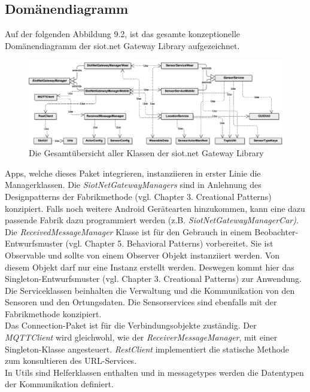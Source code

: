 \subsection{Domänendiagramm}
Auf der folgenden Abbildung 9.2, ist das gesamte konzeptionelle Domänendiagramm der siot.net Gateway Library aufgezeichnet.
\begin{figure}[H]
  \centering
  \includegraphics[scale=0.12]{98_Bilder/09_Konzept/DomaindiagrammSiotNetGatewayLibrary}
  \caption[siot.net Gateway Library Domänendiagramm]{Die Gesamtübersicht aller Klassen der siot.net Gateway Library}
\end{figure}
Apps, welche dieses Paket integrieren, instanziieren in erster Linie die Managerklassen. Die \textit{SiotNetGatewayManagers} sind in Anlehnung des Designpatterns der Fabrikmethode (vgl. \cite{gof:design_patterns} Chapter 3. Creational Patterns) konzipiert. Falls noch weitere Android Gerätearten hinzukommen, kann eine dazu passende Fabrik dazu programmiert werden (z.B. \textit{SiotNetGatewayManagerCar)}. Die \textit{ReceivedMessageManager} Klasse ist für den Gebrauch in einem Beobachter-Entwurfsmuster (vgl. \cite{gof:design_patterns} Chapter 5. Behavioral Patterns) vorbereitet. Sie ist Observable und sollte von einem Observer Objekt instanziiert werden. Von diesem Objekt darf nur eine Instanz erstellt werden. Deswegen kommt hier das Singleton-Entwurfsmuster (vgl. \cite{gof:design_patterns} Chapter 3. Creational Patterns) zur Anwendung. \\
Die Serviceklassen beinhalten die Verwaltung und die Kommunikation von den Sensoren und den Ortungsdaten. Die Sensorservices sind ebenfalls mit der Fabrikmethode konzipiert.\\
Das Connection-Paket ist für die Verbindungsobjekte zuständig. Der \textit{\gls{MQTT}Client} wird gleichwohl, wie der \textit{ReceiverMessageManager}, mit einer Singleton-Klasse angesteuert. \textit{RestClient} implementiert die statische Methode zum konsultieren des \gls{URL}-Services.\\
In Utils sind Helferklassen enthalten und in messagetypes werden die Datentypen der Kommunikation definiert.
\newpage
